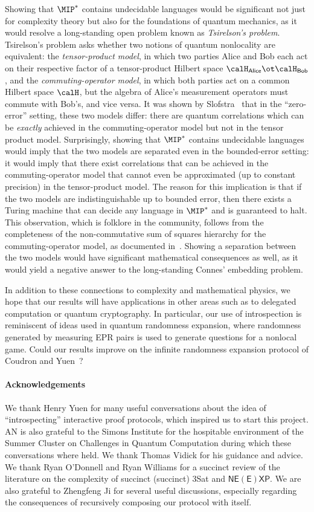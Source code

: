 \documentclass[11pt]{article}
\newcommand{\reg}[1]{{\mathsf{#1}}}
\begin{document}
Showing that $\MIP^*$ contains undecidable languages would be
significant not just for complexity theory but also for the
foundations of quantum mechanics, as it would resolve a long-standing
open problem known as \emph{Tsirelson's problem}. Tsirelson's problem
asks whether two notions of quantum nonlocality are equivalent: the
\emph{tensor-product model}, in which two parties Alice and Bob each
act on their respective factor of a tensor-product Hilbert space
$\calH_{\reg{Alice}} \ot \calH_{\reg{Bob}}$, and the
\emph{commuting-operator model}, in which both parties act on a common
Hilbert space $\calH$, but the algebra of Alice's measurement
operators must commute with Bob's, and vice versa. It was shown by
Slofstra~\cite{Slo16} that in the ``zero-error'' setting, these two
models differ: there are quantum correlations which can be
\emph{exactly} achieved in the commuting-operator model but not in the
tensor product model. Surprisingly, showing that $\MIP^*$ contains
undecidable languages would imply that the two models are separated
even in the bounded-error setting: it would imply that there exist
correlations that can be achieved in the commuting-operator model that cannot
even be approximated (up to constant precision) in the tensor-product
model. The reason for this implication is that if the two models are
indistinguishable up to bounded error, then there exists a Turing machine
that can decide any language in $\MIP^*$ and is guaranteed to halt. 
This observation, which is folklore in the community, follows from the completeness of the non-commutative
sum of squares hierarchy for the commuting-operator model, as
documented in~\cite{FJVY19}. Showing a separation between the two
models would have significant mathematical consequences as well, as it
would yield a negative answer to the long-standing Connes' embedding problem.

In addition to these connections to complexity and mathematical
physics, we hope that our results will have applications in other
areas such as to delegated computation or quantum cryptography. In particular,
our use of introspection is reminiscent of ideas used in quantum
randomness expansion, where randomness generated by measuring EPR
pairs is used to generate questions for a nonlocal game. Could our
results improve on the infinite randomness expansion protocol of
Coudron and Yuen~\cite{CY14}?
\paragraph{Acknowledgements}
We thank Henry Yuen for many useful conversations about the idea of
``introspecting'' interactive proof protocols, which inspired us to
start this project. AN is also grateful to the Simons Institute for
the hospitable environment of the Summer Cluster on Challenges in
Quantum Computation during which these conversations where held. We thank Thomas Vidick for his guidance and advice.  We thank Ryan O'Donnell and
Ryan Williams for a succinct review of the literature on the
complexity of succinct (succinct) 3Sat and $\mathsf{NE(E)XP}$. We are
also grateful to Zhengfeng Ji for several useful discussions, especially regarding the
consequences of recursively composing our protocol with itself.
\end{document}
